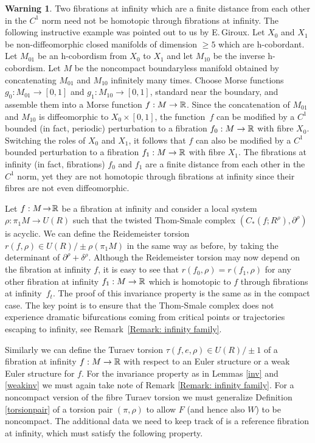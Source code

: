 \documentclass[11pt]{article}
\numberwithin{equation}{section}\providecommand{\dpl}{\displaystyle}
\theoremstyle{plain}
\theoremstyle{definition}
\newtheorem{warning}[theorem]{Warning}
\begin{document}
\begin{warning}
Two fibrations at infinity which are a finite distance from each other in the $C^1$ norm need not be homotopic through fibrations at infinity. The following instructive example was pointed out to us by E.\,Giroux. Let $X_0$ and $X_1$ be non-diffeomorphic closed manifolds of dimension $\geq 5$ which are h-cobordant. Let $M_{01}$ be an h-cobordism from $X_0$ to $X_1$ and let $M_{10}$ be the inverse h-cobordism. Let $M$ be the noncompact boundaryless manifold obtained by concatenating $M_{01}$ and $M_{10}$ infinitely many times. Choose Morse functions $g_0:M_{01} \to [0,1]$ and $g_1:M_{10} \to [0,1]$, standard near the boundary, and assemble them into a Morse function $f:M \to \mathbb{R}$. Since the concatenation of $M_{01}$ and $M_{10}$ is diffeomorphic to $X_0 \times [0,1]$, the function~$f$ can be modified by a $C^1$ bounded (in fact, periodic) perturbation to a fibration $f_0 : M \to \mathbb{R}$ with fibre $X_0$. Switching the roles of $X_0$ and $X_1$, it follows that $f$ can also be modified by a $C^1$ bounded perturbation to a fibration $f_1: M \to \mathbb{R}$ with fibre $X_1$. The fibrations at infinity (in fact, fibrations) $f_0$ and $f_1$ are a finite distance from each other in the $C^1$ norm, yet they are not homotopic through fibrations at infinity since their fibres are not even diffeomorphic.
\end{warning}

Let $f:M\!\to\!\mathbb{R}$ be a fibration at infinity and consider a local system \hbox{$\rho: \pi_1 M\!\to\!U(R)$} such that the twisted Thom-Smale complex $(C_*(f; R^\rho), \partial^\rho)$ is acyclic. We can define the Reidemeister torsion $r(f,\rho) \in U(R) / \pm \rho(\pi_1M)$ in the same way as before, by taking the determinant of $\partial^\rho + \delta^\rho$. Although the Reidemeister torsion may now depend on the fibration at infinity $f$, it is easy to see that $r(f_0,\rho)=r(f_1,\rho)$ for any other fibration at infinity $f_1: M \to \mathbb{R}$ which is homotopic to $f$ through fibrations at infinity~$f_t$. The proof of this invariance property is the same as in the compact case. The key point is to ensure that the Thom-Smale complex does not experience dramatic bifurcations coming from critical points or trajectories escaping to infinity, see Remark~\ref{Remark: infinity family}.

Similarly we can define the Turaev torsion $\tau(f,e,\rho) \in U(R) / \pm 1$ of a fibration at infinity $f:M \to \mathbb{R}$ with respect to an Euler structure or a weak Euler structure for $f$. For the invariance property as in Lemmas \ref{inv} and \ref{weakinv} we must again take note of Remark \ref{Remark: infinity family}. For a noncompact version of the fibre Turaev torsion we must generalize Definition \ref{torsionpair} of a torsion pair $(\pi,\rho)$ to allow $F$ (and hence also $W$) to be noncompact. The additional data we need to keep track of is a reference fibration at infinity, which must satisfy the following property.
\end{document}
